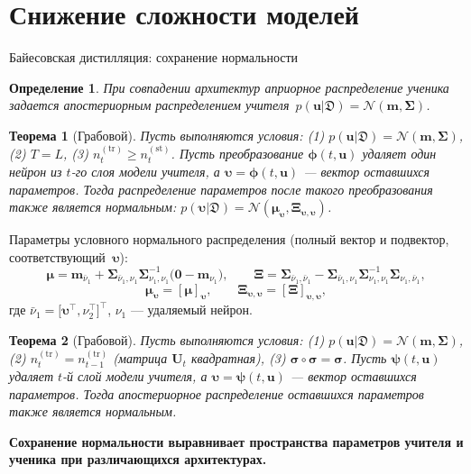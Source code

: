 \documentclass[9pt,pdf,hyperref={unicode}]{beamer}
\newtheorem{rustheorem}{Теорема}
\newtheorem{rusdefinition}{Определение}
\newcommand{\key}[1]{\par\vspace{0.5ex}\noindent\textbf{\color{darkgreen}#1}}
\begin{document}
\section{Снижение сложности моделей}
\begin{frame}{Байесовская дистилляция: сохранение нормальности}
\justifying
\footnotesize
\begin{rusdefinition}
    При совпадении архитектур априорное распределение ученика задается апостериорным распределением учителя~$p(\mathbf{u}|\mathfrak{D})=\mathcal{N}(\mathbf{m},\boldsymbol{\Sigma})$.
\end{rusdefinition}
\begin{rustheorem}[Грабовой]
    Пусть выполняются условия: (1) $p(\mathbf{u}|\mathfrak{D})=\mathcal{N}(\mathbf{m},\boldsymbol{\Sigma})$, (2) $T=L$, (3) $n_t^{(\mathrm{tr})}\ge n_t^{(\mathrm{st})}$. Пусть преобразование $\boldsymbol{\phi}(t,\mathbf{u})$ удаляет один нейрон из $t$-го слоя модели учителя, а $\boldsymbol{\upsilon}=\boldsymbol{\phi}(t,\mathbf{u})$ --- вектор оставшихся параметров. Тогда распределение параметров после такого преобразования также является нормальным: $p(\boldsymbol{\upsilon}|\mathfrak{D})=\mathcal{N}(\boldsymbol{\mu}_{\boldsymbol{\upsilon}},\boldsymbol{\Xi}_{\boldsymbol{\upsilon},\boldsymbol{\upsilon}})$.
\end{rustheorem}
Параметры условного нормального распределения (полный вектор и подвектор, соответствующий~$\boldsymbol{\upsilon}$):
\[
    \boldsymbol{\mu}=\mathbf{m}_{\bar{\nu}_1}+\boldsymbol{\Sigma}_{\bar{\nu}_1,\nu_1}\boldsymbol{\Sigma}_{\nu_1,\nu_1}^{-1}\bigl(\mathbf{0}-\mathbf{m}_{\nu_1}\bigr),\qquad
    \boldsymbol{\Xi}=\boldsymbol{\Sigma}_{\bar{\nu}_1,\bar{\nu}_1}-\boldsymbol{\Sigma}_{\bar{\nu}_1,\nu_1}\boldsymbol{\Sigma}_{\nu_1,\nu_1}^{-1}\boldsymbol{\Sigma}_{\nu_1,\bar{\nu}_1},
\]
\[
    \boldsymbol{\mu}_{\boldsymbol{\upsilon}}=[\boldsymbol{\mu}]_{\boldsymbol{\upsilon}},\qquad
    \boldsymbol{\Xi}_{\boldsymbol{\upsilon},\boldsymbol{\upsilon}}=[\boldsymbol{\Xi}]_{\boldsymbol{\upsilon},\boldsymbol{\upsilon}},
\]
где $\bar{\nu}_1=\bigl[\boldsymbol{\upsilon}^{\top},\nu_2^{\top}\bigr]^{\top}$, $\nu_1$ --- удаляемый нейрон.
\begin{rustheorem}[Грабовой]
    Пусть выполняются условия: (1) $p(\mathbf{u}|\mathfrak{D})=\mathcal{N}(\mathbf{m},\boldsymbol{\Sigma})$, (2) $n_t^{(\mathrm{tr})}=n_{t-1}^{(\mathrm{tr})}$ (матрица $\mathbf{U}_t$ квадратная), (3) $\boldsymbol{\sigma}\circ\boldsymbol{\sigma}=\boldsymbol{\sigma}$. Пусть $\boldsymbol{\psi}(t,\mathbf{u})$ удаляет $t$-й слой модели учителя, а $\boldsymbol{\upsilon}=\boldsymbol{\psi}(t,\mathbf{u})$ --- вектор оставшихся параметров. Тогда апостериорное распределение оставшихся параметров также является нормальным.
\end{rustheorem}
\key{Сохранение нормальности выравнивает пространства параметров учителя и ученика при различающихся архитектурах.}
\end{frame}
\end{document}
